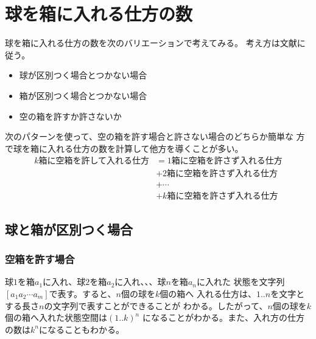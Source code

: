 \begingroup %
	\newcommand{\id}{\myop{id}}
	\newcommand{\onto}{\myop{onto}}
\section{球を箱に入れる仕方の数}\label{s1:球を箱に入れる仕方の数} %
	球を箱に入れる仕方の数を次のバリエーションで考えてみる。
	考え方は文献\cite{html:iga.math}に従う。
	\begin{itemize}\setlength{\itemsep}{-1mm} %
		\item 球が区別つく場合とつかない場合
		\item 箱が区別つく場合とつかない場合
		\item 空の箱を許すか許さないか
	\end{itemize} %
	次のパターンを使って、空の箱を許す場合と許さない場合のどちらか簡単な
	方で球を箱に入れる仕方の数を計算して他方を導くことが多い。
	\begin{equation}\label{eq:空箱ありは空箱なしの直和}\begin{split} %
		k\text{箱に空箱を許して入れる仕方} 
		&= 1\text{箱に空箱を許さず入れる仕方} \\
		&+ 2\text{箱に空箱を許さず入れる仕方} \\
		&+ \cdots \\
		&+ k\text{箱に空箱を許さず入れる仕方}
	\end{split}\end{equation} %
\subsection{球と箱が区別つく場合}\label{s2:球と箱が区別つく場合} %
\subsubsection{空箱を許す場合}\label{s3:空箱を許す場合} %
	球$1$を箱$a_1$に入れ、球$2$を箱$a_2$に入れ、、、球$n$を箱$a_n$に入れた
	状態を文字列$[a_1a_2\cdots a_m]$で表す。すると、$n$個の球を$k$個の箱へ
	入れる仕方は、$1..n$を文字とする長さ$n$の文字列で表すことができることが
	わかる。したがって、$n$個の球を$k$個の箱へ入れた状態空間は$(1..k)^n$
	になることがわかる。また、入れ方の仕方の数は$k^n$になることもわかる。
